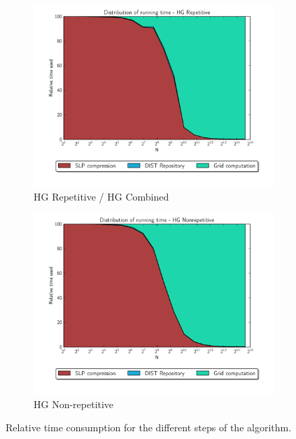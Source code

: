\documentclass[twoside,11pt,openright]{report}
\begin{document}
\begin{figure}[!ht]
  \begin{subfigure}{0.495\textwidth}
    \centering
    \includegraphics[width=\textwidth]{combined/hg_repetitive_area_plot}
    \caption{HG Repetitive / HG Combined}
    \label{fig:benchmark:relative-runningtime-hg-repetitive}
  \end{subfigure}
  \begin{subfigure}{0.495\textwidth}
    \centering
    \includegraphics[width=\textwidth]{combined/hg_nonrepetitive_area_plot}
    \caption{HG Non-repetitive}
    \label{fig:benchmark:relative-runningtime-hg-nonrepetitive}
  \end{subfigure}
  \caption{Relative time consumption for the different steps of the algorithm.}
  \label{fig:benchmark:relative-runningtime}
\end{figure}
\restoregeometry
\end{document}
